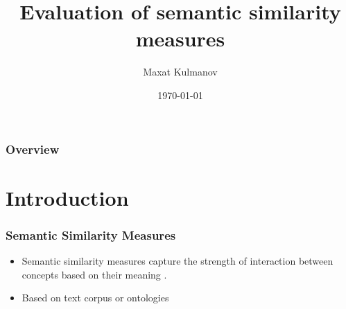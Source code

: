 \documentclass{beamer}
\title[Similarity Measures]{Evaluation of semantic similarity measures} %
\author{Maxat Kulmanov} %
\institute[KAUST, CBRC] %
{
King Abdullah University of Science and Technology \\ %
\medskip
}
\date{\today} %
\begin{document}
\begin{frame}
\titlepage %
\end{frame}

\begin{frame}
\frametitle{Overview} %
\tableofcontents %
\end{frame}


\section{Introduction} %


\begin{frame}
\frametitle{Semantic Similarity Measures}
\begin{itemize}
\item Semantic similarity measures capture the strength of interaction between concepts based on their meaning \cite{p1}.
\item Based on text corpus or ontologies
\end{itemize}
\end{frame}
\end{document}
